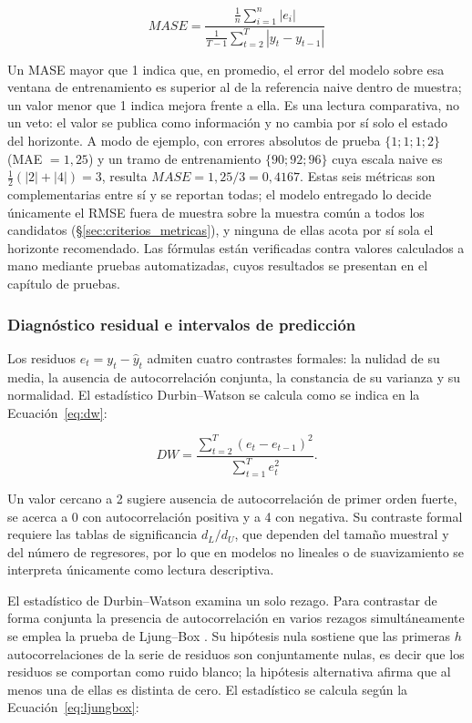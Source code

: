 \documentclass[12pt,letterpaper]{article}
\providecommand{\parencite}{\citep}
\begin{document}
\begin{equation}
MASE=\frac{\frac{1}{n}\sum_{i=1}^{n}|e_i|}{\frac{1}{T-1}\sum_{t=2}^{T}|y_t-y_{t-1}|}
\label{eq:mase}
\end{equation}

Un MASE mayor que 1 indica que, en promedio, el error del modelo sobre esa ventana de entrenamiento es superior al de la referencia naive dentro de muestra; un valor menor que 1 indica mejora frente a ella. Es una lectura comparativa, no un veto: el valor se publica como información y no cambia por sí solo el estado del horizonte. A modo de ejemplo, con errores absolutos de prueba $\{1;1;1;2\}$ (MAE $=1{,}25$) y un tramo de entrenamiento $\{90;92;96\}$ cuya escala naive es $\tfrac{1}{2}(|2|+|4|)=3$, resulta $MASE=1{,}25/3=0{,}4167$. Estas seis métricas son complementarias entre sí y se reportan todas; el modelo entregado lo decide únicamente el RMSE fuera de muestra sobre la muestra común a todos los candidatos (§\ref{sec:criterios_metricas}), y ninguna de ellas acota por sí sola el horizonte recomendado. Las fórmulas están verificadas contra valores calculados a mano mediante pruebas automatizadas, cuyos resultados se presentan en el capítulo de pruebas.

\subsubsection{Diagnóstico residual e intervalos de predicción}

Los residuos \(e_t=y_t-\hat{y}_t\) admiten cuatro contrastes formales: la nulidad de su media, la ausencia de autocorrelación conjunta, la constancia de su varianza y su normalidad. El estadístico Durbin--Watson se calcula como se indica en la Ecuación~\ref{eq:dw}:

\begin{equation}
DW=\frac{\sum_{t=2}^{T}(e_t-e_{t-1})^2}{\sum_{t=1}^{T}e_t^2}.
\label{eq:dw}
\end{equation}

Un valor cercano a 2 sugiere ausencia de autocorrelación de primer orden fuerte, se acerca a 0 con autocorrelación positiva y a 4 con negativa. Su contraste formal requiere las tablas de significancia $d_L/d_U$, que dependen del tamaño muestral y del número de regresores, por lo que en modelos no lineales o de suavizamiento se interpreta únicamente como lectura descriptiva.

El estadístico de Durbin--Watson examina un solo rezago. Para contrastar de forma conjunta la presencia de autocorrelación en varios rezagos simultáneamente se emplea la prueba de Ljung--Box \parencite{ljung_box1978}. Su hipótesis nula sostiene que las primeras $h$ autocorrelaciones de la serie de residuos son conjuntamente nulas, es decir que los residuos se comportan como ruido blanco; la hipótesis alternativa afirma que al menos una de ellas es distinta de cero. El estadístico se calcula según la Ecuación~\ref{eq:ljungbox}:
\end{document}

